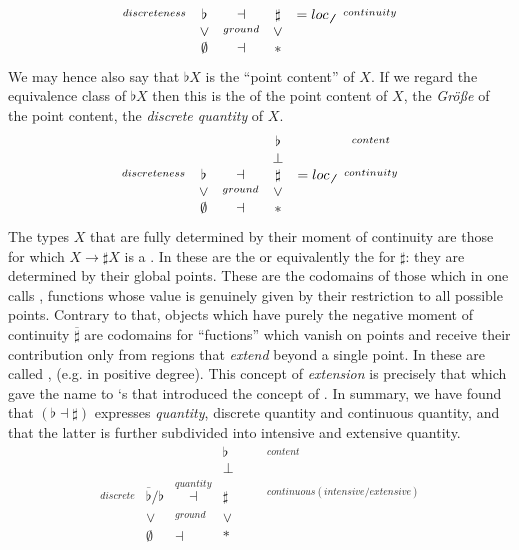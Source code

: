 \documentclass[12pt,titlepage]{article}
\newcommand{\itexarray}[1]{\begin{matrix}#1\end{matrix}}
\theoremstyle{plain}
\theoremstyle{definition}
\theoremstyle{remark}
\begin{document}
\begin{displaymath}
\itexarray{
\stackrel{discreteness}{} & \flat &\dashv& \sharp &= loc_{\not\not}& \stackrel{continuity}{}
\\
& \vee &\stackrel{ground}{}& \vee
\\
& \emptyset &\dashv& \ast &
}
\end{displaymath}
We may hence also say that $\flat X$ is the ``point content'' of $X$. If we regard the equivalence class of $\flat X$ then this is the  of the point content of $X$, the \emph{Größe} of the point content, the \emph{discrete quantity} of $X$.
\begin{displaymath}
\itexarray{
& && \flat && \stackrel{content}{}
\\
& && \bot &
\\
\stackrel{discreteness}{} & \flat &\dashv& \sharp & = loc_{\not \not}&  \stackrel{continuity}{}
\\
& \vee &\stackrel{ground}{}& \vee
\\
& \emptyset &\dashv& \ast &
}
\end{displaymath}
The types $X$ that are fully determined by their moment of continuity are those for which $X \to \sharp X$ is a . In  these are the  or equivalently the  for $\sharp$: they are determined by their global points. These are the codomains of those  which in  one calls , functions whose value is genuinely given by their restriction to all possible points.
Contrary to that, objects which have purely the negative moment of continuity $\overline{\sharp}$ are codomains for ``fuctions'' which vanish on points and receive their contribution only from regions that \emph{extend} beyond a single point. In  these are called , (e.g.  in positive degree). This concept of \emph{extension} is precisely that which gave the name to `s  that introduced the concept of  .
In summary, we have found that $(\flat \dashv \sharp)$ expresses \emph{quantity}, discrete quantity and continuous quantity, and that the latter is further subdivided into intensive and extensive quantity.
\begin{displaymath}
\itexarray{
& && \flat & && \stackrel{content}{}
\\
& && \bot & &&
\\
\stackrel{discrete}{} & \overline{\flat}/\flat &\stackrel{quantity}{\dashv}& \sharp &  &   & \stackrel{continuous (intensive/extensive)}{}
\\
& \vee &\stackrel{ground}{}& \vee
\\
& \emptyset &\dashv& \ast &
}
\end{displaymath}
\end{document}
